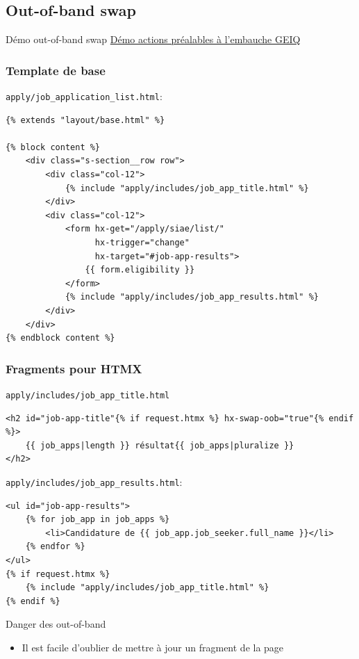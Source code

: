 \documentclass{beamer}
\begin{document}
\subsection*{Out-of-band swap}

\begin{frame}{Démo out-of-band swap}
    \href{https://demo.emplois.inclusion.beta.gouv.fr/}{Démo actions préalables à l'embauche GEIQ}
\end{frame}

\begin{frame}[fragile]
    \frametitle{Template de base}

    \texttt{apply/job\_application\_list.html}:

    \begin{verbatim}
{% extends "layout/base.html" %}

{% block content %}
    <div class="s-section__row row">
        <div class="col-12">
            {% include "apply/includes/job_app_title.html" %}
        </div>
        <div class="col-12">
            <form hx-get="/apply/siae/list/"
                  hx-trigger="change"
                  hx-target="#job-app-results">
                {{ form.eligibility }}
            </form>
            {% include "apply/includes/job_app_results.html" %}
        </div>
    </div>
{% endblock content %}
    \end{verbatim}
\end{frame}

\begin{frame}[fragile]
    \frametitle{Fragments pour HTMX}
    \texttt{apply/includes/job\_app\_title.html}
    \begin{verbatim}
<h2 id="job-app-title"{% if request.htmx %} hx-swap-oob="true"{% endif %}>
    {{ job_apps|length }} résultat{{ job_apps|pluralize }}
</h2>
    \end{verbatim}
    \texttt{apply/includes/job\_app\_results.html}:
    \begin{verbatim}
<ul id="job-app-results">
    {% for job_app in job_apps %}
        <li>Candidature de {{ job_app.job_seeker.full_name }}</li>
    {% endfor %}
</ul>
{% if request.htmx %}
    {% include "apply/includes/job_app_title.html" %}
{% endif %}
    \end{verbatim}
\end{frame}

\begin{frame}{Danger des out-of-band}
    \begin{itemize}
        \item Il est facile d'oublier de mettre à jour un fragment de la page
    \end{itemize}
\end{frame}
\end{document}
